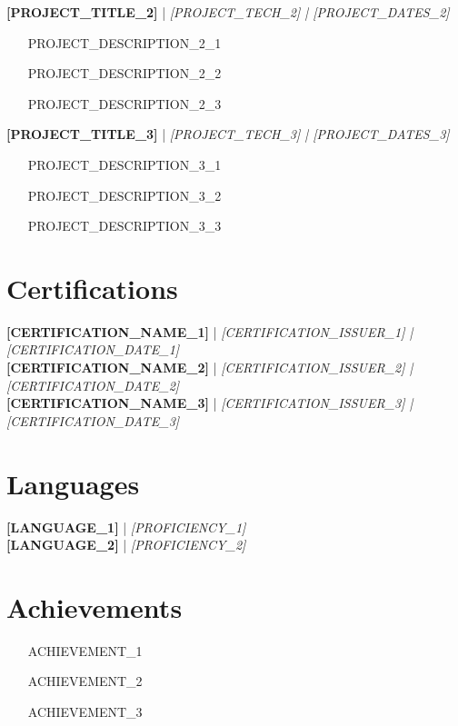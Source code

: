 \documentclass[11pt,a4paper]{article}
\begin{document}
\textbf{[PROJECT_TITLE\_2]} | \textit{[PROJECT_TECH\_2] | [PROJECT_DATES\_2]}\\[0.2cm]
\begin{itemize}[leftmargin=*,noitemsep,topsep=2pt]
    \item [PROJECT_DESCRIPTION_2\_1]
    \item [PROJECT_DESCRIPTION_2\_2]
    \item [PROJECT_DESCRIPTION_2\_3]
\end{itemize}

\textbf{[PROJECT_TITLE\_3]} | \textit{[PROJECT_TECH\_3] | [PROJECT_DATES\_3]}\\[0.2cm]
\begin{itemize}[leftmargin=*,noitemsep,topsep=2pt]
    \item [PROJECT_DESCRIPTION_3\_1]
    \item [PROJECT_DESCRIPTION_3\_2]
    \item [PROJECT_DESCRIPTION_3\_3]
\end{itemize}

\vspace{8pt}

\section{Certifications}
\textbf{[CERTIFICATION_NAME\_1]} | \textit{[CERTIFICATION_ISSUER\_1] | [CERTIFICATION_DATE\_1]}\\[0.2cm]
\textbf{[CERTIFICATION_NAME\_2]} | \textit{[CERTIFICATION_ISSUER\_2] | [CERTIFICATION_DATE\_2]}\\[0.2cm]
\textbf{[CERTIFICATION_NAME\_3]} | \textit{[CERTIFICATION_ISSUER\_3] | [CERTIFICATION_DATE\_3]}\\[0.2cm]

\vspace{8pt}

\section{Languages}
\textbf{[LANGUAGE\_1]} | \textit{[PROFICIENCY\_1]}\\[0.2cm]
\textbf{[LANGUAGE\_2]} | \textit{[PROFICIENCY\_2]}\\[0.2cm]

\vspace{8pt}

\section{Achievements}
\begin{itemize}[leftmargin=*,noitemsep,topsep=2pt]
    \item [ACHIEVEMENT\_1]
    \item [ACHIEVEMENT\_2]
    \item [ACHIEVEMENT\_3]
\end{itemize}
\end{document}
